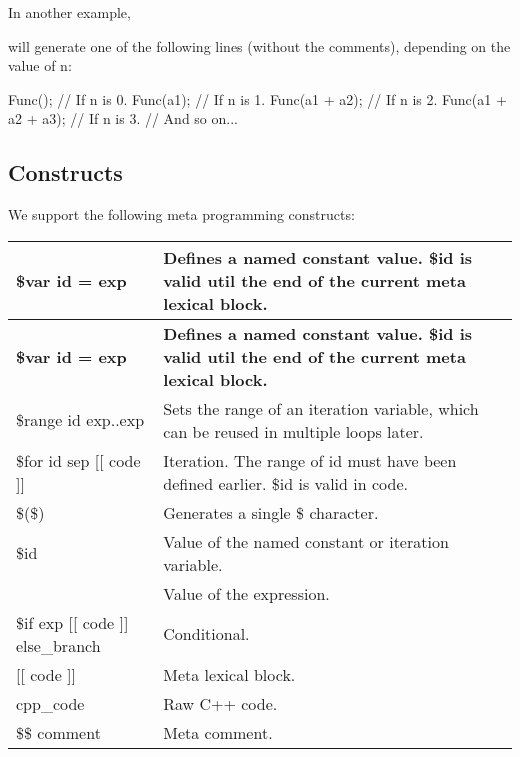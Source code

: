 In another example,


\begin{DoxyCode}
$range i 1..n
Func($for i + [[a$i]]);
$$ The text between i and [[ is the separator between iterations.
\end{DoxyCode}


will generate one of the following lines (without the comments), depending on the value of {\ttfamily n}\+:


\begin{DoxyCode}
Func();              // If n is 0.
Func(a1);            // If n is 1.
Func(a1 + a2);       // If n is 2.
Func(a1 + a2 + a3);  // If n is 3.
// And so on...
\end{DoxyCode}


\subsection*{Constructs}

We support the following meta programming constructs\+:

\tabulinesep=1mm
\begin{longtabu} spread 0pt [c]{*{2}{|X[-1]}|}
\hline
\rowcolor{\tableheadbgcolor}\textbf{ {\ttfamily \$var id = exp}  }&\textbf{ Defines a named constant value. {\ttfamily \$id} is valid util the end of the current meta lexical block.   }\\
\endfirsthead
\hline
\endfoot
\hline
\rowcolor{\tableheadbgcolor}\textbf{ {\ttfamily \$var id = exp}  }&\textbf{ Defines a named constant value. {\ttfamily \$id} is valid util the end of the current meta lexical block.   }\\
\endhead
{\ttfamily \$range id exp..exp}  &Sets the range of an iteration variable, which can be reused in multiple loops later.   \\
{\ttfamily \$for id sep \mbox{[}\mbox{[} code \mbox{]}\mbox{]}}  &Iteration. The range of {\ttfamily id} must have been defined earlier. {\ttfamily \$id} is valid in {\ttfamily code}.   \\
{\ttfamily \$(\$)}  &Generates a single {\ttfamily \$} character.   \\
{\ttfamily \$id}  &Value of the named constant or iteration variable.   \\
{\ttfamily }  &Value of the expression.   \\
{\ttfamily \$if exp \mbox{[}\mbox{[} code \mbox{]}\mbox{]} else\+\_\+branch}  &Conditional.   \\
{\ttfamily \mbox{[}\mbox{[} code \mbox{]}\mbox{]}}  &Meta lexical block.   \\
{\ttfamily cpp\+\_\+code}  &Raw C++ code.   \\
{\ttfamily \$\$ comment}  &Meta comment.   \\
\end{longtabu}


